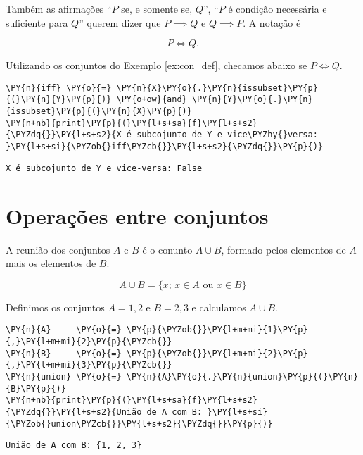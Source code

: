 \documentclass{book}
\begin{document}
        Também as afirmações ``$P$ se, e somente se, $Q$'', ``$P$ é condição necessária e suficiente para $Q$'' querem dizer que $P \implies Q$ e $Q \implies P$. A notação é

        $$P \iff Q \text{.}$$

        \begin{exemplo}
            Utilizando os conjuntos do Exemplo \ref{ex:con_def}, checamos abaixo se $P \iff Q$.



\begin{Verbatim}[commandchars=\\\{\},frame=single,fontsize=\small, xleftmargin=0.5em]
\PY{n}{iff} \PY{o}{=} \PY{n}{X}\PY{o}{.}\PY{n}{issubset}\PY{p}{(}\PY{n}{Y}\PY{p}{)} \PY{o+ow}{and} \PY{n}{Y}\PY{o}{.}\PY{n}{issubset}\PY{p}{(}\PY{n}{X}\PY{p}{)}
\PY{n+nb}{print}\PY{p}{(}\PY{l+s+sa}{f}\PY{l+s+s2}{\PYZdq{}}\PY{l+s+s2}{X é subcojunto de Y e vice\PYZhy{}versa: }\PY{l+s+si}{\PYZob{}iff\PYZcb{}}\PY{l+s+s2}{\PYZdq{}}\PY{p}{)}
\end{Verbatim}

\begin{Verbatim}[commandchars=\\\{\},frame=leftline,fontsize=\small, xleftmargin=0.5em]
X é subcojunto de Y e vice-versa: False
\end{Verbatim}

        \end{exemplo}

    \section{Operações entre conjuntos}

        A reunião dos conjuntos $A$ e $B$ é o conunto $A \cup B$, formado pelos elementos de $A$ mais os elementos de $B$.

        $$A \cup B = \{ x\text{; } x \in A \text{ ou } x \in B \}$$

        \begin{exemplo}
        \label{ex:uniao}
            Definimos os conjuntos $A = {1,2}$ e $B={2,3}$ e calculamos $A \cup B$.


\begin{Verbatim}[commandchars=\\\{\},frame=single,fontsize=\small, xleftmargin=0.5em]
\PY{n}{A}     \PY{o}{=} \PY{p}{\PYZob{}}\PY{l+m+mi}{1}\PY{p}{,}\PY{l+m+mi}{2}\PY{p}{\PYZcb{}}
\PY{n}{B}     \PY{o}{=} \PY{p}{\PYZob{}}\PY{l+m+mi}{2}\PY{p}{,}\PY{l+m+mi}{3}\PY{p}{\PYZcb{}}
\PY{n}{union} \PY{o}{=} \PY{n}{A}\PY{o}{.}\PY{n}{union}\PY{p}{(}\PY{n}{B}\PY{p}{)}
\PY{n+nb}{print}\PY{p}{(}\PY{l+s+sa}{f}\PY{l+s+s2}{\PYZdq{}}\PY{l+s+s2}{União de A com B: }\PY{l+s+si}{\PYZob{}union\PYZcb{}}\PY{l+s+s2}{\PYZdq{}}\PY{p}{)}
\end{Verbatim}

\begin{Verbatim}[commandchars=\\\{\},frame=leftline,fontsize=\small, xleftmargin=0.5em]
União de A com B: {1, 2, 3}
\end{Verbatim}

        \end{exemplo}
\end{document}
